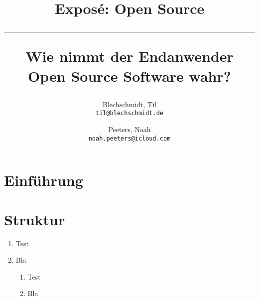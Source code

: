 \documentclass[a4paper]{article}
\title{Exposé: Open Source \\
    \noindent\rule[0.25ex]{\linewidth}{0.5pt}
    \large Wie nimmt der Endanwender Open Source Software wahr?
}
\author{
  Blechschmidt, Til\\
  \texttt{til@blechschmidt.de}
  \and
  Peeters, Noah\\
  \texttt{noah.peeters@icloud.com}
}
\begin{document}
	\thispagestyle{fancy}
	\maketitle
	\clearpage
	
	\section{Einführung}
	   
	\section{Struktur}
	
	\begin{enumerate}
	    \item Test
	    \item Bla
        \begin{enumerate}
        	    \item Test
        	    \item Bla
        	\end{enumerate}
	\end{enumerate}
    
    \clearpage
    \nocite{*}
    
\end{document}
